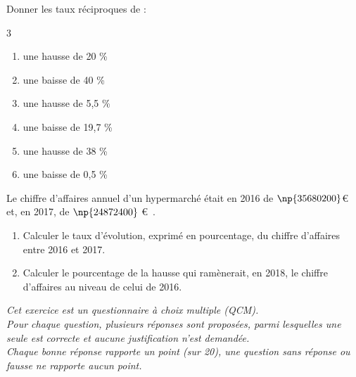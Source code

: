 \exo 

Donner les taux réciproques de :

\begin{multicols}{3}
\begin{enumerate}
\item une hausse de 20 \% 
\item une baisse de 40 \%
\item une hausse de 5,5 \%
\item une baisse de 19,7 \%
\item une hausse de 38 \%
\item une baisse de 0,5 \%
\end{enumerate}
\end{multicols}

\exo

Le chiffre d'affaires annuel d'un hypermarché était en 2016 de $\np{35680200}$\euro ~ et, en 2017, de $\np{24872400} $ \euro ~.

\begin{enumerate}

\item Calculer le taux d'évolution, exprimé en pourcentage, du chiffre d'affaires entre 2016 et 2017. 
\item Calculer le pourcentage de la hausse qui ramènerait, en 2018, le chiffre d'affaires au niveau de celui de 2016.

\end{enumerate}

\exo 

\emph{Cet exercice est un questionnaire à choix multiple (QCM).\\ 
Pour chaque question, plusieurs réponses sont proposées, parmi lesquelles une seule est correcte et aucune  justification n'est demandée.\\ 
Chaque bonne réponse rapporte un point (sur 20), une question sans réponse ou fausse ne rapporte aucun point.}

\smallskip

\begin{alterqcm}[lq=10.5cm]

\end{alterqcm}

